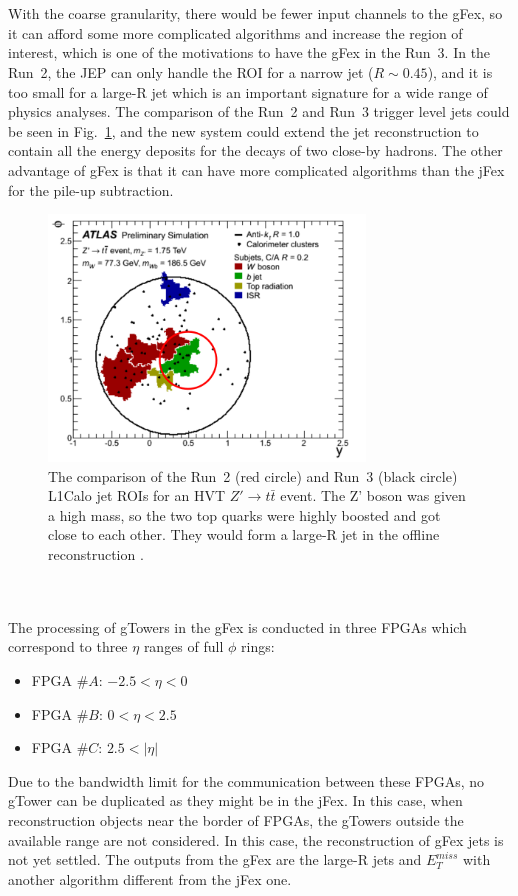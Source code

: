 \noindent
\\
\\With the coarse granularity, there would be fewer input channels to the gFex, so it can afford some more complicated algorithms and increase the region of interest, which is one of the motivations to have the gFex in the Run~3. In the Run~2, the JEP can only handle the ROI for a narrow jet ($R\sim 0.45$), and it is too small for a large-R jet which is an important signature for a wide range of physics analyses. The comparison of the Run~2 and Run~3 trigger level jets could be seen in Fig.~\ref{Fig:ZPrimett}, and the new system could extend the jet reconstruction to contain all the energy deposits for the decays of two close-by hadrons. The other advantage of gFex is that it can have more complicated algorithms than the jFex for the pile-up subtraction. 
\begin{figure}[!h]                
	\includegraphics[width=0.75\textwidth]{Chapter6/TrigJetRange.png}
	\begin{center}
		\caption{The comparison of the Run~2 (red circle) and Run~3 (black circle) L1Calo jet ROIs for an HVT $Z'\to t\bar{t}$ event. The Z' boson was given a high mass, so the two top quarks were highly boosted and got close to each other. They would form a large-R jet in the offline reconstruction \cite{Tang:2289434}.  }
		\label{Fig:ZPrimett}            
	\end{center}
\end{figure}
\noindent
\\
\\The processing of gTowers in the gFex is conducted in three FPGAs which correspond to three $\eta$ ranges of full $\phi$ rings:
\begin{itemize}
	\item FPGA $\#A$: $-2.5<\eta<0$
	\item FPGA $\#B$: $0<\eta<2.5$
	\item FPGA $\#C$: $2.5<|\eta|$
\end{itemize}
Due to the bandwidth limit for the communication between these FPGAs, no gTower can be duplicated as they might be in the jFex. In this case, when reconstruction objects near the border of FPGAs, the gTowers outside the available range are not considered. In this case, the reconstruction of gFex jets is not yet settled. The outputs from the gFex are the large-R jets and $E^{miss}_{T}$ with another algorithm different from the jFex one.
